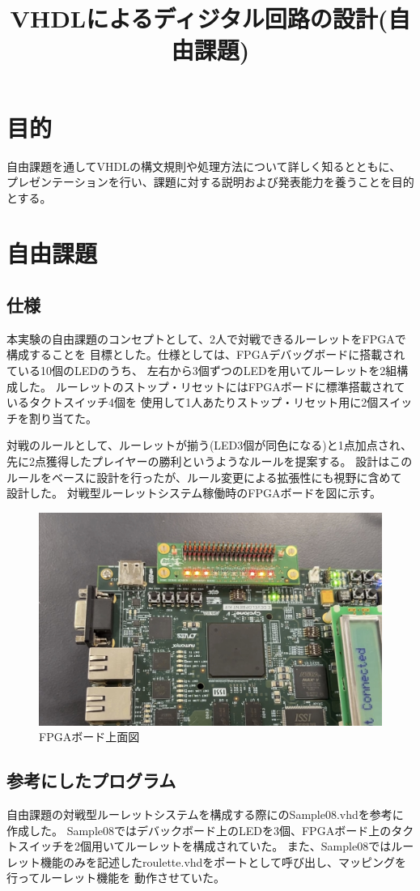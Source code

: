 \documentclass{ltjsarticle}
\title{VHDLによるディジタル回路の設計(自由課題)}
\begin{document}
\maketitle

\section{目的}
	自由課題を通してVHDLの構文規則や処理方法について詳しく知るとともに、
	プレゼンテーションを行い、課題に対する説明および発表能力を養うことを目的とする。
\section{自由課題}
	\subsection{仕様}
		本実験の自由課題のコンセプトとして、2人で対戦できるルーレットをFPGAで構成することを
		目標とした。仕様としては、FPGAデバッグボードに搭載されている10個のLEDのうち、
		左右から3個ずつのLEDを用いてルーレットを2組構成した。
		ルーレットのストップ・リセットにはFPGAボードに標準搭載されているタクトスイッチ4個を
		使用して1人あたりストップ・リセット用に2個スイッチを割り当てた。

		対戦のルールとして、ルーレットが揃う(LED3個が同色になる)と1点加点され、
		先に2点獲得したプレイヤーの勝利というようなルールを提案する。
		設計はこのルールをベースに設計を行ったが、ルール変更による拡張性にも視野に含めて
		設計した。
		対戦型ルーレットシステム稼働時のFPGAボードを図に示す。
		\begin{figure}[H]
		\centering
		\includegraphics[width = 12cm]{figs/IMG_4552.PNG}
		\caption{FPGAボード上面図}
		\label{fig:FPGA}
		\end{figure}
	\subsection{参考にしたプログラム}
		自由課題の対戦型ルーレットシステムを構成する際に\cite{ref:指導書}のSample08.vhdを参考に作成した。
		Sample08ではデバックボード上のLEDを3個、FPGAボード上のタクトスイッチを2個用いてルーレットを構成されていた。
		また、Sample08ではルーレット機能のみを記述したroulette.vhdをポートとして呼び出し、マッピングを行ってルーレット機能を
		動作させていた。
\end{document}
